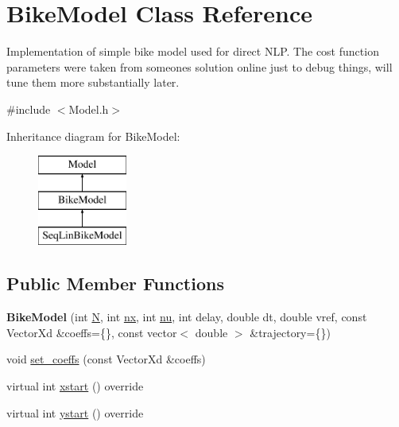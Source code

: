 \hypertarget{classBikeModel}{}\section{Bike\+Model Class Reference}
\label{classBikeModel}


Implementation of simple bike model used for direct N\+LP. The cost function parameters were taken from someone\textquotesingle{}s solution online just to debug things, will tune them more substantially later.  




{\ttfamily \#include $<$Model.\+h$>$}

Inheritance diagram for Bike\+Model\+:\begin{figure}[H]
\begin{center}
\leavevmode
\includegraphics[height=3.000000cm]{classBikeModel}
\end{center}
\end{figure}
\subsection*{Public Member Functions}
\begin{DoxyCompactItemize}
\item 
\mbox{\label{classBikeModel_a379ad0dd5141fd1627e27d607bba76b5}} 
{\bfseries Bike\+Model} (int \mbox{\hyperlink{classModel_aca776f8a10906afa8a5c362034727921}{N}}, int \mbox{\hyperlink{classModel_a951f42de158e872b5affece79521b968}{nx}}, int \mbox{\hyperlink{classModel_a0afbb992dab28ae89f1b0b114d65689c}{nu}}, int delay, double dt, double vref, const Vector\+Xd \&coeffs=\{\}, const vector$<$ double $>$ \&trajectory=\{\})
\item 
void \mbox{\hyperlink{classBikeModel_a697e6ec00a4a38ca844c491041cc9b86}{set\+\_\+coeffs}} (const Vector\+Xd \&coeffs)
\item 
virtual int \mbox{\hyperlink{classBikeModel_a920787379d6fef804f46bc1f3f885a89}{xstart}} () override
\item 
virtual int \mbox{\hyperlink{classBikeModel_a05b988f106df902d1222dfb662d4b1fa}{ystart}} () override
\end{DoxyCompactItemize}
